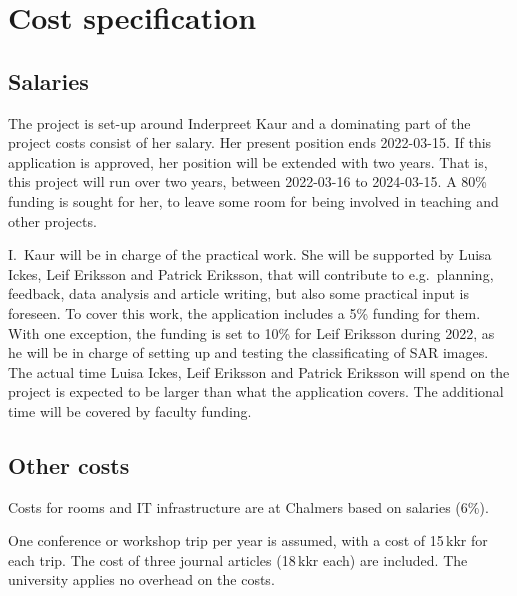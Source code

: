 \documentclass[12pt,oneside,a4paper]{article}
\begin{document}
\thispagestyle{empty}


\section*{Cost specification}

\subsection*{Salaries}
%
The project is set-up around Inderpreet Kaur and a dominating part of the
project costs consist of her salary. Her present position ends 2022-03-15. If
this application is approved, her position will be extended with two years.
That is, this project will run over two years, between 2022-03-16 to
2024-03-15. A 80\% funding is sought for her, to leave some room for being
involved in teaching and other projects.

I.\ Kaur will be in charge of the practical work. She will be supported by
Luisa Ickes, Leif Eriksson and Patrick Eriksson, that will contribute to e.g.\
planning, feedback, data analysis and article writing, but also some practical
input is foreseen. To cover this work, the application includes a 5\% funding
for them. With one exception, the funding is set to 10\% for Leif Eriksson
during 2022, as he will be in charge of setting up and testing the
classificating of SAR images. The actual time Luisa Ickes, Leif Eriksson and
Patrick Eriksson will spend on the project is expected to be larger than what
the application covers. The additional time will be covered by faculty funding.




\subsection*{Other costs}
%
Costs for rooms and IT infrastructure are at Chalmers based on salaries
(6\%).

One conference or workshop trip per year is assumed, with a cost of 15\,kkr for
each trip. The cost of three journal articles (18\,kkr each) are included. The
university applies no overhead on the costs.
\end{document}
